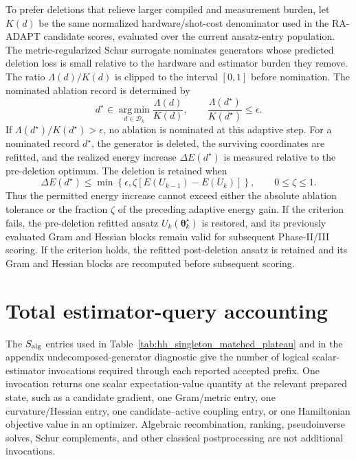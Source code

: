 \documentclass[
  reprint,
  amsmath,
  amssymb,
  aps,
  pra,
  nofootinbib,
  superscriptaddress,
  floatfix
]{revtex4-2}
\begin{document}
To prefer deletions that relieve larger compiled and measurement burden, let
\(K(d)\) be the same normalized hardware/shot-cost denominator used in the RA-ADAPT
candidate scores, evaluated over the current ansatz-entry population. The
metric-regularized Schur surrogate nominates generators whose predicted
deletion loss is small relative to the hardware and estimator burden they
remove. The ratio
\(\Lambda(d)/K(d)\) is clipped to the interval \([0,1]\) before nomination.
The nominated ablation record is determined by
\begin{equation*}
d^\star
\in
\operatorname*{arg\,min}_{d\in\mathcal D_k}
\frac{\Lambda(d)}{K(d)},
\qquad
\frac{\Lambda(d^\star)}{K(d^\star)}
\le
\epsilon .
\end{equation*}
If \(\Lambda(d^\star)/K(d^\star)>\epsilon\), no ablation is nominated at this
adaptive step.
For a nominated record \(d^\star\), the generator is deleted, the surviving
coordinates are refitted, and the realized energy increase
\(\Delta E(d^\star)\) is measured relative to the pre-deletion optimum. The
deletion is retained when
\begin{equation*}
\Delta E(d^\star)
\le
\min\!\left\{
\epsilon,
\zeta\left[E(U_{k-1})-E(U_k)\right]
\right\},
\qquad 0\le\zeta\le1.
\end{equation*}
Thus the permitted energy increase cannot exceed either the absolute ablation
tolerance or the fraction \(\zeta\) of the preceding adaptive energy gain. If
the criterion fails, the pre-deletion refitted ansatz
\(U_k(\boldsymbol\theta_k^\star)\) is restored, and its previously evaluated
Gram and Hessian blocks remain valid for subsequent Phase-II/III scoring. If
the criterion holds, the refitted post-deletion ansatz is retained and its Gram
and Hessian blocks are recomputed before subsequent scoring.




\section{Total estimator-query accounting}
\label{app:estimator_queries}
The \(S_{\rm alg}\) entries used in
Table~\ref{tab:hh_singleton_matched_plateau} and in the appendix
undecomposed-generator diagnostic give the number of logical scalar-estimator
invocations required through each reported accepted prefix.
One invocation returns one scalar expectation-value quantity at the
relevant prepared state, such as a candidate gradient, one Gram/metric entry,
one curvature/Hessian entry, one candidate--active coupling entry, or one
Hamiltonian objective value in an optimizer. Algebraic recombination, ranking,
pseudoinverse solves, Schur complements, and other classical postprocessing
are not additional invocations.
\end{document}

